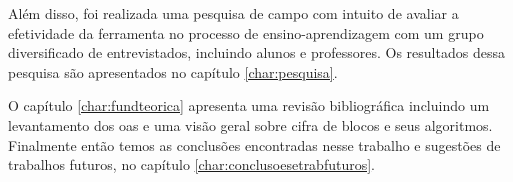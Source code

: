 Além disso, foi realizada uma pesquisa de campo com intuito de avaliar a efetividade da ferramenta no processo de ensino-aprendizagem com um grupo diversificado de entrevistados, incluindo alunos e professores. Os resultados dessa pesquisa são apresentados no capítulo \ref{char:pesquisa}.

O capítulo \ref{char:fundteorica} apresenta uma revisão bibliográfica incluindo um levantamento dos \acrshort{oas} e uma visão geral sobre cifra de blocos e seus algoritmos. Finalmente então temos as conclusões encontradas nesse trabalho e sugestões de trabalhos futuros, no capítulo \ref{char:conclusoesetrabfuturos}.
